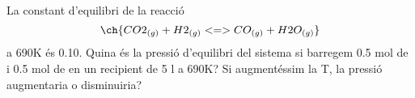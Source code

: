 \begin{exr}{}
La constant d'equilibri de la reacció
\[
\ch{CO2_{(g)} + H2_{(g)} <=> CO_{(g)} + H2O_{(g)}}
\]
a 690K és 0.10. Quina és la pressió d'equilibri del sistema si barregem 0.5 mol de  i 0.5 mol de  en un recipient de 5 l a 690K?
Si augmentéssim la T, la pressió augmentaria o disminuiria?
\end{exr}
